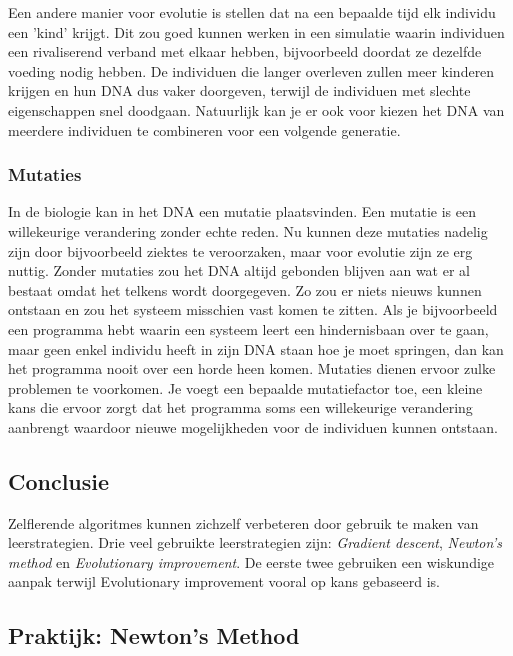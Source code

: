 Een andere manier voor evolutie is stellen dat na een bepaalde tijd elk individu een 'kind' krijgt. Dit zou goed kunnen werken in een simulatie waarin individuen een rivaliserend verband met elkaar hebben, bijvoorbeeld doordat ze dezelfde voeding nodig hebben. De individuen die langer overleven zullen meer kinderen krijgen en hun DNA dus vaker doorgeven, terwijl de individuen met slechte eigenschappen snel doodgaan. Natuurlijk kan je er ook voor kiezen het DNA van meerdere individuen te combineren voor een volgende generatie.

\subsubsection{Mutaties}
In de biologie kan in het DNA een mutatie plaatsvinden. Een mutatie is een willekeurige verandering zonder echte reden. Nu kunnen deze mutaties nadelig zijn door bijvoorbeeld ziektes te veroorzaken, maar voor evolutie zijn ze erg nuttig. Zonder mutaties zou het DNA altijd gebonden blijven aan wat er al bestaat omdat het telkens wordt doorgegeven. Zo zou er niets nieuws kunnen ontstaan en zou het systeem misschien vast komen te zitten. Als je bijvoorbeeld een programma hebt waarin een systeem leert een hindernisbaan over te gaan, maar geen enkel individu heeft in zijn DNA staan hoe je moet springen, dan kan het programma nooit over een horde heen komen. Mutaties dienen ervoor zulke problemen te voorkomen. Je voegt een bepaalde mutatiefactor toe, een kleine kans die ervoor zorgt dat het programma soms een willekeurige verandering aanbrengt waardoor nieuwe mogelijkheden voor de individuen kunnen ontstaan.

\subsection{Conclusie}
Zelflerende algoritmes kunnen zichzelf verbeteren door gebruik te maken van leerstrategien. Drie veel gebruikte leerstrategien zijn: \textit{Gradient descent}, \textit{Newton's method} en \textit{Evolutionary improvement}. De eerste twee gebruiken een wiskundige aanpak  terwijl Evolutionary improvement vooral op kans gebaseerd is.

\textcolor{praktijk}{
\subsection{Praktijk: Newton's Method}
}